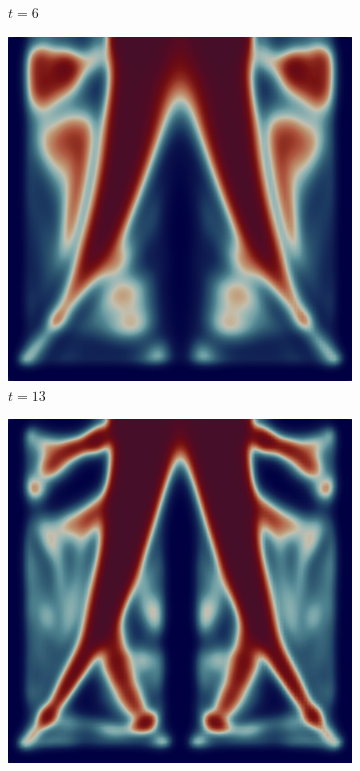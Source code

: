 \begin{figure}[H]
\begin{subfigure}{.4\textwidth}
        \caption{$t = 6$}
    \end{subfigure}
    \begin{subfigure}{.4\textwidth}
        \includegraphics[width=\textwidth]{imgs/UnitSquare_1/third.png}
        \caption{$t = 13$}
    \end{subfigure}
    \begin{subfigure}{.4\textwidth}
        \includegraphics[width=\textwidth]{imgs/UnitSquare_1/fourth.png}

\end{subfigure}
\end{figure}
